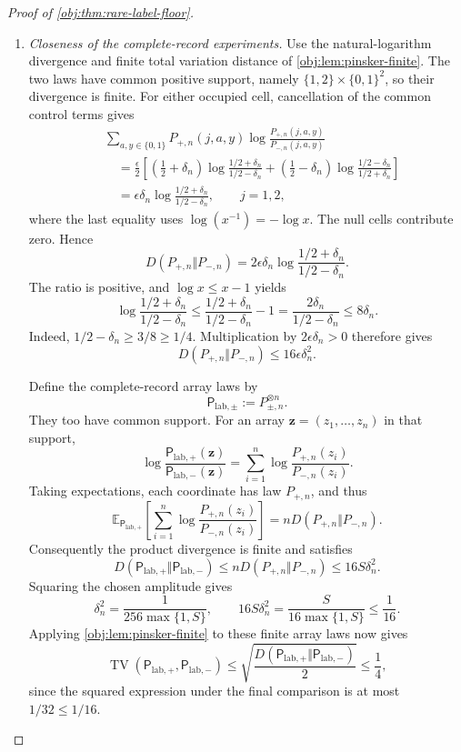 \documentclass[11pt]{article}
\begin{document}
\begin{proof}[Proof of \cref{obj:thm:rare-label-floor}]
\begin{enumerate}
\item \textit{Closeness of the complete-record experiments.}
Use the natural-logarithm divergence and finite total variation distance of
\cref{obj:lem:pinsker-finite}. The two laws have common positive support,
namely \(\{1,2\}\times\{0,1\}^2\), so their divergence is finite.
For either occupied cell, cancellation of the common control terms gives
\[
\begin{aligned}
&\sum_{a,y\in\{0,1\}}
P_{+,n}(j,a,y)
\log\frac{P_{+,n}(j,a,y)}{P_{-,n}(j,a,y)}\\
&\quad=
\frac{\epsilon}{2}\left[
\left(\frac12+\delta_n\right)
\log\frac{1/2+\delta_n}{1/2-\delta_n}
+
\left(\frac12-\delta_n\right)
\log\frac{1/2-\delta_n}{1/2+\delta_n}
\right]\\
&\quad=
\epsilon\delta_n
\log\frac{1/2+\delta_n}{1/2-\delta_n},
\qquad j=1,2,
\end{aligned}
\]
where the last equality uses \(\log(x^{-1})=-\log x\).
The null cells contribute zero. Hence
\[
D(P_{+,n}\Vert P_{-,n})
=
2\epsilon\delta_n
\log\frac{1/2+\delta_n}{1/2-\delta_n}.
\]
The ratio is positive, and \(\log x\le x-1\) yields
\[
\log\frac{1/2+\delta_n}{1/2-\delta_n}
\le
\frac{1/2+\delta_n}{1/2-\delta_n}-1
=
\frac{2\delta_n}{1/2-\delta_n}
\le8\delta_n.
\]
Indeed, \(1/2-\delta_n\ge3/8\ge1/4\). Multiplication by
\(2\epsilon\delta_n>0\) therefore gives
\[
D(P_{+,n}\Vert P_{-,n})
\le16\epsilon\delta_n^2.
\]

Define the complete-record array laws by
\[
\mathsf P_{\mathrm{lab},\pm}:=P_{\pm,n}^{\otimes n}.
\]
They too have common support. For an array
\(\boldsymbol z=(z_1,\ldots,z_n)\) in that support,
\[
\log
\frac{\mathsf P_{\mathrm{lab},+}(\boldsymbol z)}
     {\mathsf P_{\mathrm{lab},-}(\boldsymbol z)}
=
\sum_{i=1}^{n}
\log\frac{P_{+,n}(z_i)}{P_{-,n}(z_i)}.
\]
Taking expectations, each coordinate has law \(P_{+,n}\), and thus
\[
\mathbb E_{\mathsf P_{\mathrm{lab},+}}
\left[
\sum_{i=1}^{n}
\log\frac{P_{+,n}(z_i)}{P_{-,n}(z_i)}
\right]
=
nD(P_{+,n}\Vert P_{-,n}).
\]
Consequently the product divergence is finite and satisfies
\[
D(\mathsf P_{\mathrm{lab},+}\Vert\mathsf P_{\mathrm{lab},-})
\le
nD(P_{+,n}\Vert P_{-,n})
\le16S\delta_n^2.
\]
Squaring the chosen amplitude gives
\[
\delta_n^2
=
\frac1{256\max\{1,S\}},
\qquad
16S\delta_n^2
=
\frac{S}{16\max\{1,S\}}
\le\frac1{16}.
\]
Applying \cref{obj:lem:pinsker-finite} to these finite array laws now gives
\[
\operatorname{TV}
(\mathsf P_{\mathrm{lab},+},\mathsf P_{\mathrm{lab},-})
\le
\sqrt{
\frac{D(\mathsf P_{\mathrm{lab},+}\Vert
        \mathsf P_{\mathrm{lab},-})}{2}}
\le\frac14,
\]
since the squared expression under the final comparison is at most
\(1/32\le1/16\).


\end{enumerate}
\end{proof}
\end{document}
